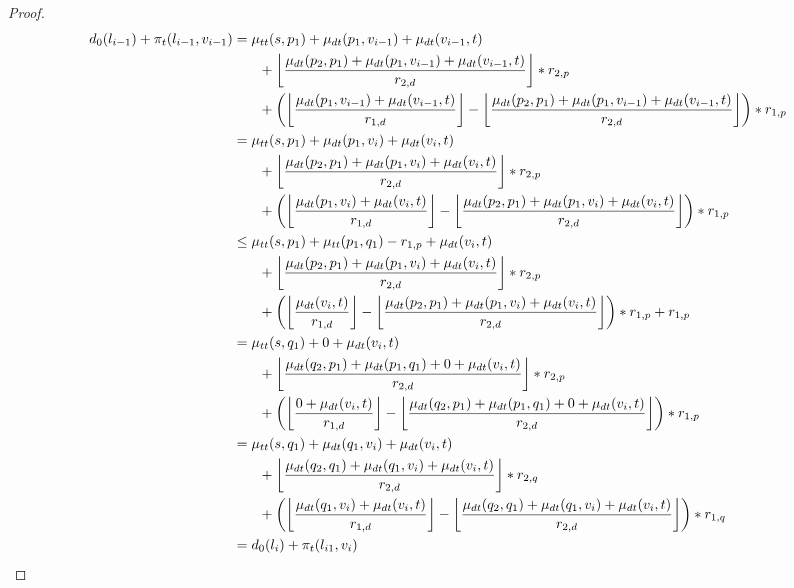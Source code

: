 \begin{proof}
	\begin{align}
		\begin{split}\label{eq:label_2_feasibility_proof_4}
			d_0(l_{i-1}) + \pi_t(l_{i-1},v_{i-1}) &= \traveltime(s, p_1) + \drivingtime(p_1,v_{i-1}) + \drivingtime(v_{i-1},t)\\
			& \phantom{{}=1} + \floor*{ \frac{\drivingtime(p_2,p_1) + \drivingtime(p_1,v_{i-1}) + \drivingtime(v_{i-1},t)}{\restr_{2,d}} } * \restr_{2,p}\\
			& \phantom{{}=1} + \left( \floor*{ \frac{\drivingtime(p_1,v_{i-1})  + \drivingtime(v_{i-1},t)}{\restr_{1,d}} } - \floor*{ \frac{\drivingtime(p_2,p_1) + \drivingtime(p_1,v_{i-1}) + \drivingtime(v_{i-1},t)}{\restr_{2,d}} }\right) * \restr_{1,p}\\
			&= \traveltime(s, p_1) + \drivingtime(p_1,v_{i}) + \drivingtime(v_{i},t)\\
			& \phantom{{}=1} + \floor*{ \frac{\drivingtime(p_2,p_1) + \drivingtime(p_1,v_{i}) + \drivingtime(v_{i},t)}{\restr_{2,d}} } * \restr_{2,p}\\
			& \phantom{{}=1} + \left( \floor*{ \frac{\drivingtime(p_1,v_{i})  + \drivingtime(v_{i},t)}{\restr_{1,d}} } - \floor*{ \frac{\drivingtime(p_2,p_1) + \drivingtime(p_1,v_{i}) + \drivingtime(v_{i},t)}{\restr_{2,d}} }\right) * \restr_{1,p}\\
			&\le \traveltime(s, p_1) + \traveltime(p_1,q_1) - r_{1,p} + \drivingtime(v_{i},t)\\
			& \phantom{{}=1} + \floor*{ \frac{\drivingtime(p_2,p_1) + \drivingtime(p_1,v_{i}) + \drivingtime(v_{i},t)}{\restr_{2,d}} } * \restr_{2,p}\\
			& \phantom{{}=1} + \left( \floor*{ \frac{\drivingtime(v_{i},t)}{\restr_{1,d}} } - \floor*{ \frac{\drivingtime(p_2,p_1) + \drivingtime(p_1,v_{i}) + \drivingtime(v_{i},t)}{\restr_{2,d}} }\right) * \restr_{1,p} + r_{1,p}\\
			&= \traveltime(s, q_1) + 0 + \drivingtime(v_{i},t)\\
			& \phantom{{}=1} + \floor*{ \frac{\drivingtime(q_2,p_1) + \drivingtime(p_1,q_{1}) + 0 + \drivingtime(v_{i},t)}{\restr_{2,d}} } * \restr_{2,p}\\
			& \phantom{{}=1} + \left( \floor*{ \frac{0 + \drivingtime(v_{i},t)}{\restr_{1,d}} } - \floor*{ \frac{\drivingtime(q_2,p_1) + \drivingtime(p_1,q_{1}) + 0 + \drivingtime(v_{i},t)}{\restr_{2,d}} }\right) * \restr_{1,p}\\
			&= \traveltime(s, q_1) + \drivingtime(q_1,v_{i}) + \drivingtime(v_{i},t)\\
			& \phantom{{}=1} + \floor*{ \frac{\drivingtime(q_2,q_1) + \drivingtime(q_1,v_{i}) + \drivingtime(v_{i},t)}{\restr_{2,d}} } * \restr_{2,q}\\
			& \phantom{{}=1} + \left( \floor*{ \frac{\drivingtime(q_1,v_{i})  + \drivingtime(v_{i},t)}{\restr_{1,d}} } - \floor*{ \frac{\drivingtime(q_2,q_1) + \drivingtime(q_1,v_{i}) + \drivingtime(v_{i},t)}{\restr_{2,d}} }\right) * \restr_{1,q}\\
			&= d_0(l_{i}) + \pi_t(l_{i1},v_{i})
		\end{split}
	\end{align}


\end{proof}
